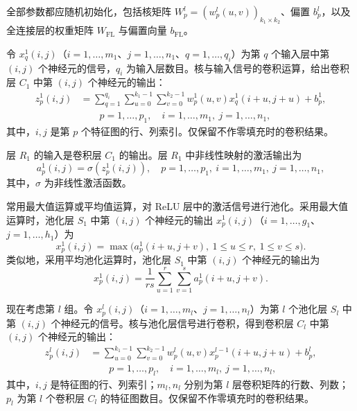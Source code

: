 
全部参数都应随机初始化，包括核矩阵 $W_p^l=(w_p^l(u,v))_{k_1\times k_2}$、偏置 $b_p^l$，以及全连接层的权重矩阵 $W_{\mathrm{FL}}$ 与偏置向量 $b_{\mathrm{FL}}$。


令 $x_q^1(i,j)$（$i=1,\ldots,m_1$、$j=1,\ldots,n_1$、$q=1,\ldots,q_i$）为第 $q$ 个输入层中第 $(i,j)$ 个神经元的信号，$q_i$ 为输入层数目。核与输入信号的卷积运算，给出卷积层 $C_1$ 中第 $(i,j)$ 个神经元的输出：
\begin{equation}
\begin{aligned}
z_p^1(i,j)&=\sum_{q=1}^{q_i}\sum_{u=0}^{k_1-1}\sum_{v=0}^{k_2-1}w_p^1(u,v)x_q^1(i+u,j+u)+b_p^1,\\
&\qquad p=1,\ldots,p_1,\quad i=1,\ldots,m_1,\ j=1,\ldots,n_1,
\end{aligned}\tag{6.101}
\end{equation}
其中，$i,j$ 是第 $p$ 个特征图的行、列索引。仅保留不作零填充时的卷积结果。


层 $R_1$ 的输入是卷积层 $C_1$ 的输出。层 $R_1$ 中非线性映射的激活输出为
\begin{equation}
a_p^1(i,j)=\sigma(z_p^1(i,j)),\quad p=1,\ldots,p_1,\ i=1,\ldots,m_1,\ j=1,\ldots,n_1,
\tag{6.102}
\end{equation}
其中，$\sigma$ 为非线性激活函数。


常用最大值运算或平均值运算，对 ReLU 层中的激活信号进行池化。采用最大值运算时，池化层 $S_1$ 中第 $(i,j)$ 个神经元的输出 $x_p^1(i,j)$（$i=1,\ldots,g_1$、$j=1,\ldots,h_1$）为
\begin{equation}
x_p^1(i,j)=\max\bigl(a_p^1(i+u,j+v),\ 1\leq u\leq r,\ 1\leq v\leq s\bigr).
\tag{6.103}
\end{equation}
类似地，采用平均池化运算时，池化层 $S_1$ 中第 $(i,j)$ 个神经元的输出为
\begin{equation}
x_p^1(i,j)=\frac1{rs}\sum_{u=1}^r\sum_{v=1}^sa_p^1(i+u,j+v).
\tag{6.104}
\end{equation}


现在考虑第 $l$ 组。令 $x_p^l(i,j)$（$i=1,\ldots,m_l$、$j=1,\ldots,n_l$）为第 $l$ 个池化层 $S_l$ 中第 $(i,j)$ 个神经元的信号。核与池化层信号进行卷积，得到卷积层 $C_l$ 中第 $(i,j)$ 个神经元的输出：
\begin{equation}
\begin{aligned}
z_p^l(i,j)&=\sum_{u=0}^{k_1-1}\sum_{v=0}^{k_2-1}w_p^l(u,v)x_p^{l-1}(i+u,j+u)+b_p^l,\\
&\qquad p=1,\ldots,p_l,\quad i=1,\ldots,m_l,\ j=1,\ldots,n_l,
\end{aligned}\tag{6.105}
\end{equation}
其中，$i,j$ 是特征图的行、列索引；$m_l,n_l$ 分别为第 $l$ 层卷积矩阵的行数、列数；$p_l$ 为第 $l$ 个卷积层 $C_l$ 的特征图数目。仅保留不作零填充时的卷积结果。


